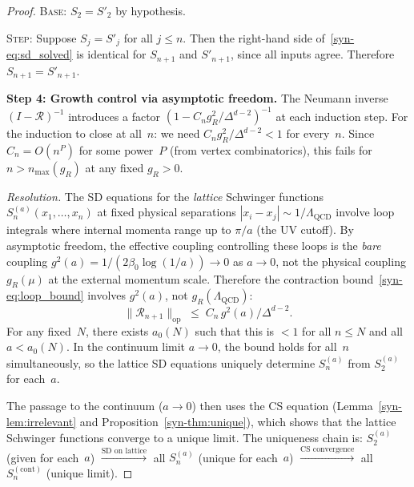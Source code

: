 \documentclass[11pt]{article}
\theoremstyle{definition}
\begin{document}
\begin{proof}
\noindent\textsc{Base}: $S_2 = S'_2$ by hypothesis.

\noindent\textsc{Step}: Suppose $S_j = S'_j$ for all
$j \leq n$.  Then the right-hand side
of~\eqref{syn-eq:sd_solved} is identical for
$S_{n+1}$ and $S'_{n+1}$, since all inputs agree.
Therefore $S_{n+1} = S'_{n+1}$.

\smallskip
\textbf{Step 4: Growth control via asymptotic freedom.}
The Neumann inverse $(I - \mathcal{R})^{-1}$ introduces
a factor $(1 - C_n g_R^2/\Delta^{d-2})^{-1}$ at each
induction step.  For the induction to close at all~$n$:
we need $C_n g_R^2/\Delta^{d-2} < 1$ for every~$n$.
Since $C_n = O(n^P)$ for some power~$P$ (from vertex
combinatorics), this fails for $n > n_{\max}(g_R)$
at any fixed $g_R > 0$.

\emph{Resolution.}
The SD equations for the \emph{lattice} Schwinger
functions $S_n^{(a)}(x_1, \ldots, x_n)$ at fixed
physical separations $|x_i - x_j| \sim 1/\Lambda_{\mathrm{QCD}}$
involve loop integrals where internal momenta range
up to $\pi/a$ (the UV cutoff).
By asymptotic freedom, the effective coupling
controlling these loops is the \emph{bare} coupling
$g^2(a) = 1/(2\beta_0\log(1/a)) \to 0$ as $a \to 0$,
not the physical coupling $g_R(\mu)$ at the
external momentum scale.
Therefore the contraction
bound~\eqref{syn-eq:loop_bound} involves $g^2(a)$,
not $g_R(\Lambda_{\mathrm{QCD}})$:
\[
  \|\mathcal{R}_{n+1}\|_{\mathrm{op}}
  \;\leq\; C_n\,g^2(a) / \Delta^{d-2}.
\]
For any fixed~$N$, there exists $a_0(N)$ such that
this is $< 1$ for all $n \leq N$ and all $a < a_0(N)$.
In the continuum limit $a \to 0$, the bound holds
for all~$n$ simultaneously, so the lattice SD
equations uniquely determine $S_n^{(a)}$ from $S_2^{(a)}$
for each~$a$.

The passage to the continuum ($a \to 0$) then uses
the CS equation (Lemma~\ref{syn-lem:irrelevant} and
Proposition~\ref{syn-thm:unique}), which shows that
the lattice Schwinger functions converge to a unique
limit.  The uniqueness chain is:
$S_2^{(a)}$ (given for each~$a$)
$\xrightarrow{\text{SD on lattice}}$
all $S_n^{(a)}$ (unique for each~$a$)
$\xrightarrow{\text{CS convergence}}$
all $S_n^{(\mathrm{cont})}$ (unique limit).
\end{proof}
\end{document}
